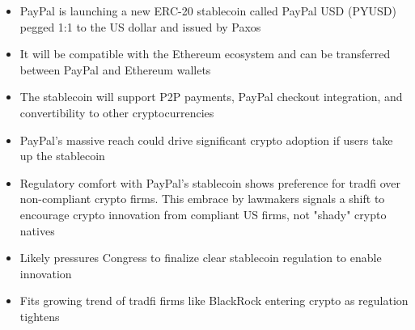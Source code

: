 \begin{itemize}
\begin{itemize}

\item PayPal is launching a new ERC-20 stablecoin called PayPal USD (PYUSD) pegged 1:1 to the US dollar and issued by Paxos
\item It will be compatible with the Ethereum ecosystem and can be transferred between PayPal and Ethereum wallets
\item The stablecoin will support P2P payments, PayPal checkout integration, and convertibility to other cryptocurrencies
\item PayPal's massive reach could drive significant crypto adoption if users take up the stablecoin
\item Regulatory comfort with PayPal's stablecoin shows preference for tradfi over non-compliant crypto firms. This embrace by lawmakers signals a shift to encourage crypto innovation from compliant US firms, not "shady" crypto natives
\item Likely pressures Congress to finalize clear stablecoin regulation to enable innovation
\item Fits growing trend of tradfi firms like BlackRock entering crypto as regulation tightens
\end{itemize}




\end{itemize}
